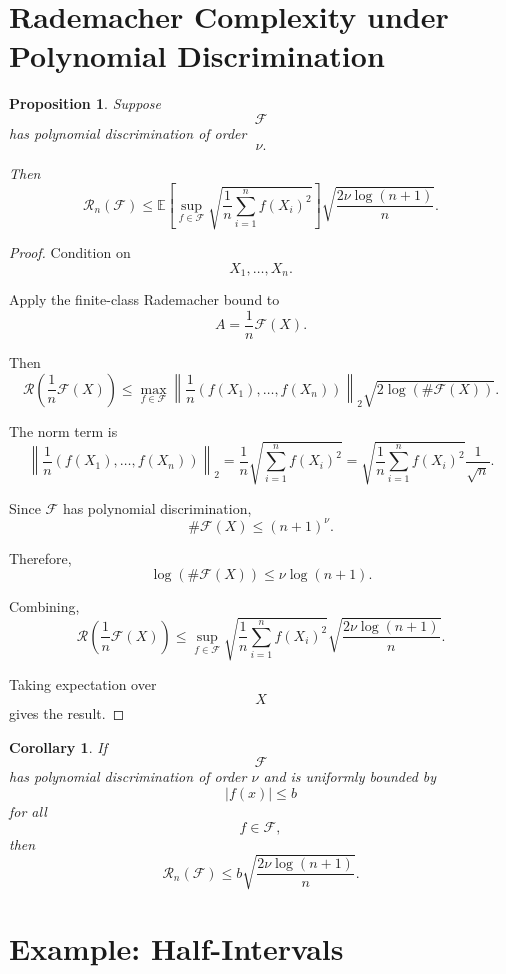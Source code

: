 \documentclass[12pt,oneside]{book}
\numberwithin{equation}{section}
\theoremstyle{definition}
\theoremstyle{plain}
\newtheorem{proposition}{Proposition}[section]
\newtheorem{corollary}{Corollary}[section]
\theoremstyle{remark}
\newcommand{\E}{\mathbb{E}}
\begin{document}
\section{Rademacher Complexity under Polynomial Discrimination}

\begin{proposition}
Suppose
\[
\mathcal{F}
\]
has polynomial discrimination of order
\[
\nu.
\]

Then
\[
\mathcal{R}_n(\mathcal{F})
\leq
\E
\left[
\sup_{f\in\mathcal{F}}
\sqrt{
\frac{1}{n}
\sum_{i=1}^n f(X_i)^2
}
\right]
\sqrt{
\frac{2\nu\log(n+1)}{n}
}.
\]
\end{proposition}

\begin{proof}
Condition on
\[
X_1,\dots,X_n.
\]

Apply the finite-class Rademacher bound to
\[
A=\frac{1}{n}\mathcal{F}(X).
\]

Then
\[
\mathcal{R}
\left(
\frac{1}{n}\mathcal{F}(X)
\right)
\leq
\max_{f\in\mathcal{F}}
\left\|
\frac{1}{n}
(f(X_1),\dots,f(X_n))
\right\|_2
\sqrt{
2\log(\#\mathcal{F}(X))
}.
\]

The norm term is
\[
\left\|
\frac{1}{n}
(f(X_1),\dots,f(X_n))
\right\|_2
=
\frac{1}{n}
\sqrt{
\sum_{i=1}^n f(X_i)^2
}
=
\sqrt{
\frac{1}{n}
\sum_{i=1}^n f(X_i)^2
}
\frac{1}{\sqrt{n}}.
\]

Since $\mathcal{F}$ has polynomial discrimination,
\[
\#\mathcal{F}(X)
\leq
(n+1)^\nu.
\]

Therefore,
\[
\log(\#\mathcal{F}(X))
\leq
\nu\log(n+1).
\]

Combining,
\[
\mathcal{R}
\left(
\frac{1}{n}\mathcal{F}(X)
\right)
\leq
\sup_{f\in\mathcal{F}}
\sqrt{
\frac{1}{n}
\sum_{i=1}^n f(X_i)^2
}
\sqrt{
\frac{2\nu\log(n+1)}{n}
}.
\]

Taking expectation over
\[
X
\]
gives the result.
\end{proof}

\begin{corollary}
If
\[
\mathcal{F}
\]
has polynomial discrimination of order $\nu$ and is uniformly bounded by
\[
|f(x)|\leq b
\]
for all
\[
f\in\mathcal{F},
\]
then
\[
\mathcal{R}_n(\mathcal{F})
\leq
b
\sqrt{
\frac{2\nu\log(n+1)}{n}
}.
\]
\end{corollary}

\section{Example: Half-Intervals}
\end{document}
